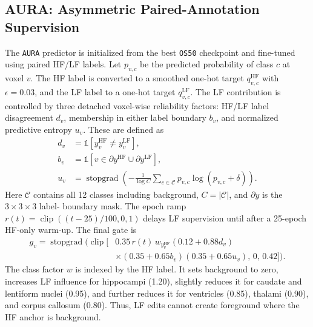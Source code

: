 \documentclass[runningheads]{llncs}
\newcommand{\osfifty}{\texttt{OS50}}
\newcommand{\aura}{\texttt{AURA}}
\begin{document}
\subsection{AURA: Asymmetric Paired-Annotation Supervision}

The \aura{} predictor is initialized from the best \osfifty{} checkpoint and fine-tuned using paired HF/LF labels. Let $p_{v,c}$ be the predicted probability of class $c$ at voxel $v$. The HF label is converted to a smoothed one-hot target $q^{\mathrm{HF}}_{v,c}$ with $\epsilon=0.03$, and the LF label to a one-hot target $q^{\mathrm{LF}}_{v,c}$. The LF contribution is controlled by three detached voxel-wise reliability factors: HF/LF label disagreement $d_v$, membership in either
  label boundary $b_v$, and normalized predictive entropy $u_v$. These are defined as
  \begin{equation}
  \begin{aligned}
  d_v &= \mathbb{1}\!\left[y^{\mathrm{HF}}_v \ne y^{\mathrm{LF}}_v\right],\\
  b_v &= \mathbb{1}\!\left[v \in \partial y^{\mathrm{HF}} \cup \partial y^{\mathrm{LF}}\right],\\
  u_v &= \operatorname{stopgrad}\!\left(
  -\frac{1}{\log C}\sum_{c\in\mathcal{C}} p_{v,c}\log(p_{v,c}+\delta)
  \right).
  \end{aligned}
  \label{eq:aura-factors}
  \end{equation}
  Here $\mathcal{C}$ contains all 12 classes including background, $C=|\mathcal{C}|$, and $\partial y$ is the $3\times3\times3$ label-
  boundary mask. The epoch ramp
  $r(t)=\operatorname{clip}((t-25)/100,0,1)$ delays LF supervision until after a
  25-epoch HF-only warm-up. The final gate is
  \begin{equation}
  \begin{aligned}
  g_v = \operatorname{stopgrad}\Big(
  \operatorname{clip}\big[
  &0.35\, r(t)\, w_{y^{\mathrm{HF}}_v}
  (0.12+0.88d_v)\\
  &\times(0.35+0.65b_v)(0.35+0.65u_v),
  \,0,\,0.42\big]\Big).
  \end{aligned}
  \label{eq:gate}
  \end{equation}
  The class factor $w$ is indexed by the HF label. It sets background to zero, increases LF influence for hippocampi (1.20),
  slightly reduces it for caudate and lentiform nuclei (0.95), and further reduces it for ventricles (0.85), thalami (0.90), and
  corpus callosum (0.80). Thus, LF edits cannot create foreground where the HF anchor is background.
\end{document}

